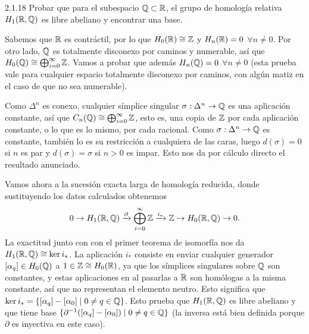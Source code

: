\documentclass[twoside]{article}
\begin{document}
\begin{ejercicio}{2.1.18}
Probar que para el subespacio $\mathbb{Q}\subset\mathbb{R}$, el grupo de homología relativa $H_1(\mathbb{R},\mathbb{Q})$ es libre abeliano y encontrar una base.
\end{ejercicio}
\begin{solucion}

Sabemos que $\mathbb{R}$ es contráctil, por lo que $H_0(\mathbb{R})\cong\mathbb{Z}$ y $H_n(\mathbb{R})=0$ $\forall n\neq 0$. Por otro lado, $\mathbb{Q}$ es totalmente disconexo por caminos y numerable, así que $H_0(\mathbb{Q})\cong\bigoplus_{i=0}^{\infty}\mathbb{Z}$. Vamos a probar que además $H_n(\mathbb{Q})=0$ $\forall n\neq 0$ (esta prueba vale para cualquier espacio totalmente disconexo por caminos, con algún matiz en el caso de que no sea numerable). 

Como $\Delta^n$ es conexo, cualquier símplice singular $\sigma:\Delta^n\to\mathbb{Q}$ es una aplicación constante, así que $C_n(\mathbb{Q})\cong\bigoplus_{i=0}^{\infty}\mathbb{Z}$, esto es, una copia de $\mathbb{Z}$ por cada aplicación constante, o lo que es lo mismo, por cada racional. Como $\sigma:\Delta^n\to\mathbb{Q}$ es constante, también lo es su restricción a cualquiera de las caras, luego $d(\sigma)=0$ si $n$ es par y $d(\sigma)=\sigma$ si $n>0$ es impar. Esto nos da por cálculo directo el resultado anunciado.


Vamos ahora a la sucesión exacta larga de homología reducida, donde sustituyendo los datos calculados obtenemos
\[
0\to H_1(\mathbb{R},\mathbb{Q})\xrightarrow{\partial} \bigoplus_{i=0}^{\infty}\mathbb{Z}\xrightarrow{i_*}\mathbb{Z}\to H_0(\mathbb{R},\mathbb{Q})\to 0.
\]
La exactitud junto con con el primer teorema de isomorfía nos da $H_1(\mathbb{R},\mathbb{Q})\cong\ker i_*$. La aplicación $i_*$ consiste en enviar cualquier generador $[\alpha_q]\in H_0(\mathbb{Q})$ a $1\in\mathbb{Z}\cong H_0(\mathbb{R})$, ya que los símplices singulares sobre $\mathbb{Q}$ son constantes, y estas aplicaciones en al pasarlas a $\mathbb{R}$ son homólogas a la misma constante, así que no representan el elemento neutro. Esto significa que $\ker i_*=\{[\alpha_q]-[\alpha_0]\mid 0\neq q\in\mathbb{Q}\}$. Esto prueba que $H_1(\mathbb{R},\mathbb{Q})$ es libre abeliano y que tiene base $\{\partial^{-1}([\alpha_q]-[\alpha_0])\mid 0\neq q\in\mathbb{Q}\}$ (la inversa está bien definida porque $\partial$ es inyectiva en este caso).
\end{solucion}
\end{document}
